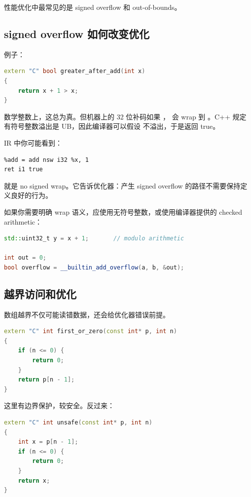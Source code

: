 性能优化中最常见的是 signed overflow 和 out-of-bounds。

\subsection{signed overflow 如何改变优化}

例子：

\begin{lstlisting}[language=C++]
extern "C" bool greater_after_add(int x)
{
    return x + 1 > x;
}
\end{lstlisting}

数学整数上，这总为真。但机器上的 32 位补码如果 ， 会 wrap 到 。C++ 规定有符号整数溢出是 UB，因此编译器可以假设  不溢出，于是返回 true。

IR 中你可能看到：

\begin{lstlisting}
%add = add nsw i32 %x, 1
ret i1 true
\end{lstlisting}

 就是 no signed wrap。它告诉优化器：产生 signed overflow 的路径不需要保持定义良好的行为。

如果你需要明确 wrap 语义，应使用无符号整数，或使用编译器提供的 checked arithmetic：

\begin{lstlisting}[language=C++]
std::uint32_t y = x + 1;       // modulo arithmetic

int out = 0;
bool overflow = __builtin_add_overflow(a, b, &out);
\end{lstlisting}

\subsection{越界访问和优化}

数组越界不仅可能读错数据，还会给优化器错误前提。

\begin{lstlisting}[language=C++]
extern "C" int first_or_zero(const int* p, int n)
{
    if (n <= 0) {
        return 0;
    }
    return p[n - 1];
}
\end{lstlisting}

这里有边界保护，较安全。反过来：

\begin{lstlisting}[language=C++]
extern "C" int unsafe(const int* p, int n)
{
    int x = p[n - 1];
    if (n <= 0) {
        return 0;
    }
    return x;
}
\end{lstlisting}

